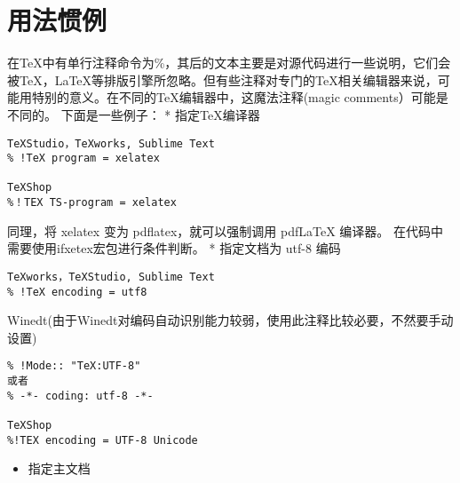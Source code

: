 %
%
%
%

\section{用法惯例}



在TeX中有单行注释命令为\%，其后的文本主要是对源代码进行一些说明，它们会被TeX，LaTeX等排版引擎所忽略。但有些注释对专门的TeX相关编辑器来说，可能用特别的意义。在不同的TeX编辑器中，这魔法注释(magic comments）可能是不同的。 下面是一些例子： * 指定TeX编译器

\begin{verbatim}
TeXStudio，TeXworks, Sublime Text
% !TeX program = xelatex

TeXShop
%！TEX TS-program = xelatex
\end{verbatim}

同理，将 xelatex 变为 pdflatex，就可以强制调用 pdfLaTeX 编译器。
在代码中需要使用ifxetex宏包进行条件判断。 * 指定文档为 utf-8 编码

\begin{verbatim}
TeXworks，TeXStudio, Sublime Text
% !TeX encoding = utf8
\end{verbatim}

Winedt(由于Winedt对编码自动识别能力较弱，使用此注释比较必要，不然要手动设置)

\begin{verbatim}
% !Mode:: "TeX:UTF-8"
或者
% -*- coding: utf-8 -*-

TeXShop
%!TEX encoding = UTF-8 Unicode
\end{verbatim}

\begin{itemize}

\item
  指定主文档
\end{itemize}

